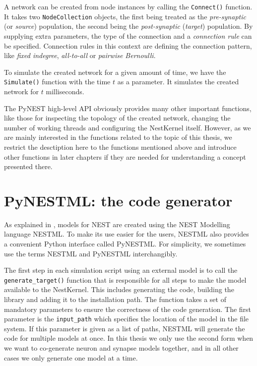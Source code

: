 A network can be created from node instances by calling the \texttt{Connect()} function. It takes two \texttt{NodeCollection} objects, the first being treated as the \emph{pre-synaptic} (or \emph{source}) population, the second being the \emph{post-synaptic} (\emph{target}) population. By supplying extra parameters, the type of the connection and a \emph{connection rule} can be specified. Connection rules in this context are defining the connection pattern, like \emph{fixed indegree}, \emph{all-to-all} or \emph{pairwise Bernoulli}.

To simulate the created network for a given amount of time, we have the \texttt{Simulate()} function with the time $t$ as a parameter. It simulates the created network for $t$ milliseconds.

The PyNEST high-level API obviously provides many other important functions, like those for inspecting the topology of the created network, changing the number of working threads and configuring the NestKernel itself. However, as we are mainly interested in the functions related to the topic of this thesis, we restrict the desctiption here to the functions mentioned above and introduce other functions in later chapters if they are needed for understanding a concept presented there.

\section{PyNESTML: the code generator}

As explained in , models for NEST are created using the NEST Modelling language NESTML. To make its use easier for the users, NESTML also provides a convenient Python interface called PyNESTML. For simplicity, we sometimes use the terms NESTML and PyNESTML interchangibly.

The first step in each simulation script using an external model is to call the \texttt{generate\_target()} function that is responsible for all steps to make the model available to the NestKernel. This includes generating the code, building the library and adding it to the installation path. The function takes a set of mandatory parameters to ensure the correctness of the code generation. The first parameter is the \texttt{input\_path} which specifies the location of the model in the file system. If this parameter is given as a list of paths, NESTML will generate the code for multiple models at once. In this thesis we only use the second form when we want to co-generate neuron and synapse models together, and in all other cases we only generate one model at a time.

